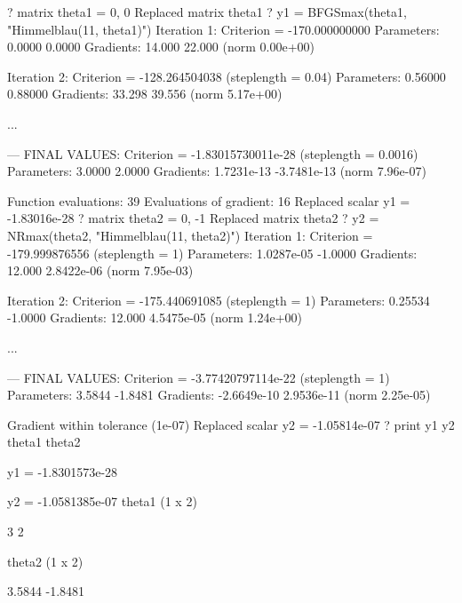 \begin{table}[ht]
  \begin{footnotesize}
\begin{scode}
? matrix theta1 = { 0, 0 }
Replaced matrix theta1
? y1 = BFGSmax(theta1, "Himmelblau(11, theta1)")
Iteration 1: Criterion = -170.000000000
Parameters:       0.0000      0.0000
Gradients:        14.000      22.000 (norm 0.00e+00)

Iteration 2: Criterion = -128.264504038 (steplength = 0.04)
Parameters:      0.56000     0.88000
Gradients:        33.298      39.556 (norm 5.17e+00)

...

--- FINAL VALUES: 
Criterion = -1.83015730011e-28 (steplength = 0.0016)
Parameters:       3.0000      2.0000
Gradients:    1.7231e-13 -3.7481e-13 (norm 7.96e-07)

Function evaluations: 39
Evaluations of gradient: 16
Replaced scalar y1 = -1.83016e-28
? matrix theta2 = { 0, -1 }
Replaced matrix theta2
? y2 = NRmax(theta2, "Himmelblau(11, theta2)")
Iteration 1: Criterion = -179.999876556 (steplength = 1)
Parameters:   1.0287e-05     -1.0000
Gradients:        12.000  2.8422e-06 (norm 7.95e-03)

Iteration 2: Criterion = -175.440691085 (steplength = 1)
Parameters:      0.25534     -1.0000
Gradients:        12.000  4.5475e-05 (norm 1.24e+00)

...

--- FINAL VALUES: 
Criterion = -3.77420797114e-22 (steplength = 1)
Parameters:       3.5844     -1.8481
Gradients:   -2.6649e-10  2.9536e-11 (norm 2.25e-05)

Gradient within tolerance (1e-07)
Replaced scalar y2 = -1.05814e-07
? print y1 y2 theta1 theta2

             y1 = -1.8301573e-28

             y2 = -1.0581385e-07
theta1 (1 x 2)

  3   2 

theta2 (1 x 2)

      3.5844      -1.8481 
\end{scode}
    
  \end{footnotesize}
  \caption{Output from maximization}
  \label{tab:optim-output}
\end{table}


